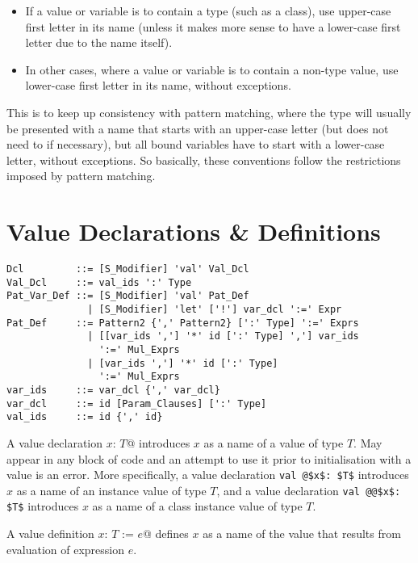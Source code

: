 \begin{itemize}
  \item If a value or variable is to contain a type (such as a class), use upper-case first letter in its name (unless it makes more sense to have a lower-case first letter due to the name itself). 
  \item In other cases, where a value or variable is to contain a non-type value, use lower-case first letter in its name, without exceptions. 
\end{itemize}

This is to keep up consistency with pattern matching, where the type will usually be presented with a name that starts with an upper-case letter (but does not need to if necessary), but all bound variables have to start with a lower-case letter, without exceptions. So basically, these conventions follow the restrictions imposed by pattern matching. 





\section{Value Declarations \& Definitions}
\label{sec:value-dcl-def}

\syntax\begin{lstlisting}
Dcl         ::= [S_Modifier] 'val' Val_Dcl
Val_Dcl     ::= val_ids ':' Type
Pat_Var_Def ::= [S_Modifier] 'val' Pat_Def
              | [S_Modifier] 'let' ['!'] var_dcl ':=' Expr
Pat_Def     ::= Pattern2 {',' Pattern2} [':' Type] ':=' Exprs
              | [[var_ids ','] '*' id [':' Type] ','] var_ids 
                ':=' Mul_Exprs
              | [var_ids ','] '*' id [':' Type] 
                ':=' Mul_Exprs
var_ids     ::= var_dcl {',' var_dcl}
var_dcl     ::= id [Param_Clauses] [':' Type]
val_ids     ::= id {',' id}
\end{lstlisting}

A value declaration \lstinline@val $x$: $T$@ introduces $x$ as a name of a value of type $T$. May appear in any block of code and an attempt to use it prior to initialisation with a value is an error. More specifically, a value declaration \lstinline+val @$x$: $T$+ introduces $x$ as a name of an instance value of type $T$, and a value declaration \lstinline+val @@$x$: $T$+ introduces $x$ as a name of a class instance value of type $T$. 

A value definition \lstinline@val $x$: $T$ := $e$@ defines $x$ as a name of the value that results from evaluation of expression $e$.

